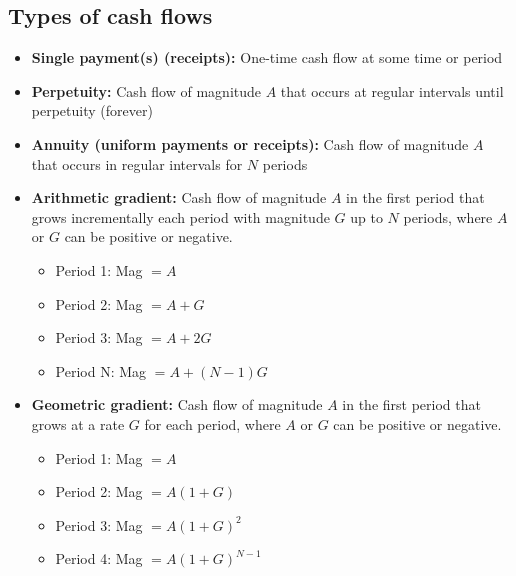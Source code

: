 \subsection{Types of cash flows}
\begin{definition}
    \begin{itemize}
        \item \textbf{Single payment(s) (receipts):} One-time cash flow at some time or period
        \item \textbf{Perpetuity:} Cash flow of magnitude \(A\) that occurs at regular intervals until perpetuity (forever)
        \item \textbf{Annuity (uniform payments or receipts):} Cash flow of magnitude \(A\) that occurs in regular intervals for \(N\) periods
        \item \textbf{Arithmetic gradient:} Cash flow of magnitude \(A\) in the first period that grows incrementally each period with magnitude \(G\) up to \(N\) periods, where $A$ or $G$ can be positive or negative.
        \begin{itemize}
            \item Period 1: Mag \(= A\)
            \item Period 2: Mag \(= A + G\)
            \item Period 3: Mag \(= A + 2G\)
            \item Period N: Mag \(= A + (N - 1)G\)
        \end{itemize}
        \item \textbf{Geometric gradient:} Cash flow of magnitude \(A\) in the first period that grows at a rate \(G\) for each period, where $A$ or $G$ can be positive or negative.
        \begin{itemize}
            \item Period 1: Mag \(= A\) 
            \item Period 2: Mag \(= A(1+G)\)
            \item Period 3: Mag \(= A(1+G)^2\)
            \item Period 4: Mag \(= A(1+G)^{N-1}\)
        \end{itemize}
    \end{itemize}
\end{definition}

